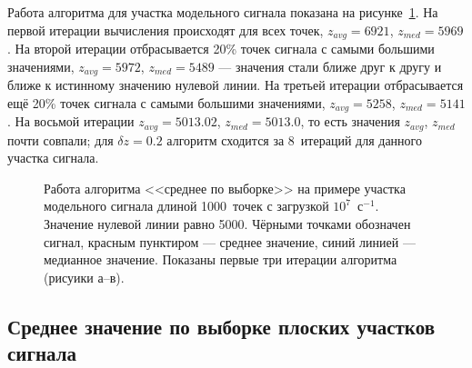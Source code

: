 Работа алгоритма для участка модельного сигнала показана на рисунке~\ref{fig:baselineMethodAvgOverSet}. На первой итерации вычисления происходят для всех точек, $z_{avg} = 6921$, $z_{med} = 5969$. На второй итерации отбрасывается 20\% точек сигнала с самыми большими значениями, $z_{avg} = 5972$, $z_{med} = 5489$ --- значения стали ближе друг к другу и ближе к истинному значению нулевой линии. На третьей итерации отбрасывается ещё 20\% точек сигнала с самыми большими значениями, $z_{avg} = 5258$, $z_{med} = 5141$. На восьмой итерации $z_{avg} = 5013.02$, $z_{med} = 5013.0$, то есть значения $z_{avg}$, $z_{med}$ почти совпали; для $\delta z = 0.2$ алгоритм сходится за 8~итераций для данного участка сигнала.~\cite{Khilkevitch2020}

\begin{figure}[ht!]
  \caption{ Работа алгоритма <<среднее по выборке>> на примере участка модельного сигнала длиной 1000~точек с загрузкой $10^7$~с${}^{-1}$. Значение нулевой линии равно 5000. Чёрными точками обозначен сигнал, красным пунктиром --- среднее значение, синий линией --- медианное значение. Показаны первые три итерации алгоритма (рисуики а--в).~\cite{Khilkevitch2020}}
  \label{fig:baselineMethodAvgOverSet}
\end{figure}


\subsection{Среднее значение по выборке плоских участков сигнала}

